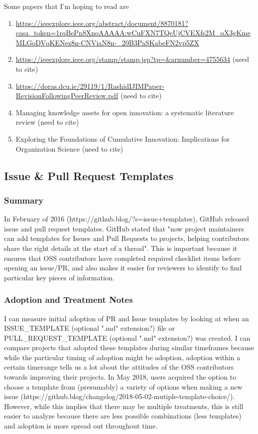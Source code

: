 \documentclass[source/paper/main.tex]{subfiles}
\begin{document}
Some papers that I'm hoping to read are
\begin{enumerate}
    \item \href{https://ieeexplore.ieee.org/abstract/document/8870181?casa_token=1rqBePn8XnoAAAAA:wCuFXN7TQeUjCVEXfs2M_qX3gKmeMLGoDVqKENez8n-CNViaN8n-_20B3PaSKabeFN2vp5ZX}{https://ieeexplore.ieee.org/abstract/document/8870181?casa\_token=1rqBePn8XnoAAAAA:wCuFXN7TQeUjCVEXfs2M\_qX3gKmeMLGoDVqKENez8n-CNViaN8n-\_20B3PaSKabeFN2vp5ZX}
    \item \href{https://ieeexplore.ieee.org/stamp/stamp.jsp?tp=&arnumber=4755634}{https://ieeexplore.ieee.org/stamp/stamp.jsp?tp=\&arnumber=4755634} (need to cite)
    \item \href{https://doras.dcu.ie/29119/1/RashidIJIMPaper-RevisionFollowingPeerReview.pdf}{https://doras.dcu.ie/29119/1/RashidIJIMPaper-RevisionFollowingPeerReview.pdf} (need to cite)
    \item Managing knowledge assets for open innovation: a systematic literature review (need to cite)
    \item Exploring the Foundations of Cumulative Innovation: Implications for Organization Science (need to cite)
\end{enumerate}
\subsection{Issue \& Pull Request Templates}
\subsubsection{Summary}
In February of 2016 (https://github.blog/?s=issue+templates), GitHub released issue and pull request templates. GitHub stated that "now project maintainers can add templates for Issues and Pull Requests to projects, helping contributors share the right details at the start of a thread". This is important because it ensures that OSS contributors have completed required checklist items before opening an issue/PR, and also makes it easier for reviewers to identify to find particular key pieces of information. 
\subsubsection{Adoption and Treatment Notes}
I can measure initial adoption of PR and Issue templates by looking at when an ISSUE\_TEMPLATE (optional ".md" extension?) file or PULL\_REQUEST\_TEMPLATE (optional ".md" extension?) was created. I can compare projects that adopted these templates during similar timeframes because while the particular timing of adoption might be adoption, adoption within a certain timerange tells us a lot about the attitudes of the OSS contributors towards improving their projects. In May 2018, users acquired the option to choose a template from (presumably) a variety of options when making a new issue (https://github.blog/changelog/2018-05-02-mutiple-template-choice/). However, while this implies that there may be multiple treatments, this is still easier to analyze because there are less possible combinations (less templates) and adoption is more spread out throughout time. 
\end{document}
